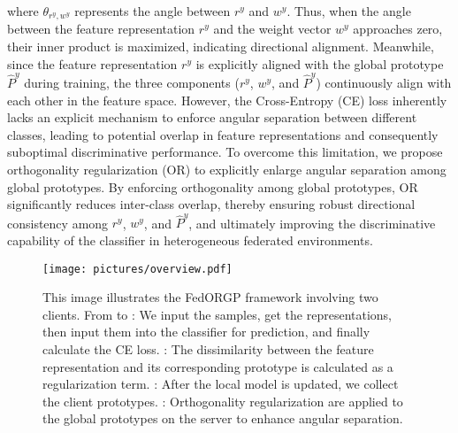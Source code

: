 where $\theta_{r^y,w^y}$ represents the angle between $r^y$ and $w^y$. Thus, when the angle between the feature representation $r^y$ and the weight vector $w^y$ approaches zero, their inner product is maximized, indicating directional alignment. Meanwhile, since the feature representation $r^y$ is explicitly aligned with the global prototype $\hat{P}^y$ during training, the three components ($r^y$, $w^y$, and $\hat{P}^y$) continuously align with each other in the feature space. However, the Cross-Entropy (CE) loss inherently lacks an explicit mechanism to enforce angular separation between different classes, leading to potential overlap in feature representations and consequently suboptimal discriminative performance. To overcome this limitation, we propose orthogonality regularization (OR) to explicitly enlarge angular separation among global prototypes. By enforcing orthogonality among global prototypes, OR significantly reduces inter-class overlap, thereby ensuring robust directional consistency among $r^y$, $w^y$, and $\hat{P}^y$, and ultimately improving the discriminative capability of the classifier in heterogeneous federated environments.

\begin{figure}[t]
    \centering
    \texttt{[image: pictures/overview.pdf]}
    \caption{This image illustrates the FedORGP framework involving two clients. From  to : We input the samples, get the representations, then input them into the classifier for prediction, and finally calculate the CE loss. : The dissimilarity between the feature representation and its corresponding prototype is calculated as a regularization term. : After the local model is updated, we collect the client prototypes. : Orthogonality regularization are applied to the global prototypes on the server to enhance angular separation.}
    \label{fig:overview}
\end{figure}


